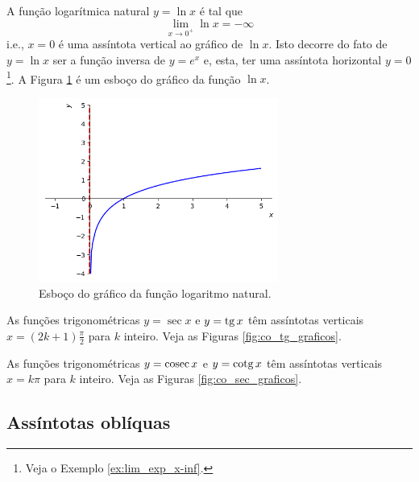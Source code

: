 \begin{ex}
  A função logarítmica natural $y = \ln x$ é tal que
  \begin{equation}
    \lim_{x\to 0^+} \ln x = -\infty
  \end{equation}
  i.e., $x=0$ é uma assíntota vertical ao gráfico de $\ln x$. Isto decorre do fato de $y = \ln x$ ser a função inversa de $y = e^x$ e, esta, ter uma assíntota horizontal $y=0$\footnote{Veja o Exemplo \ref{ex:lim_exp_x-inf}.}. A Figura \ref{fig:ex_lim_assvert_lnx} é um esboço do gráfico da função  $\ln x$.

    \begin{figure}[H]
      \centering
      \includegraphics[width=0.7\textwidth]{./cap_lim/dados/fig_ex_lim_assvert_lnx/fig_ex_lim_assvert_lnx}
      \caption{Esboço do gráfico da função logaritmo natural.}
      \label{fig:ex_lim_assvert_lnx}
    \end{figure}  
\end{ex}

\begin{ex}
  As funções trigonométricas $y = \sec x$ e $\displaystyle y = \operatorname{tg} x$ têm assíntotas verticais $x = (2k+1)\frac{\pi}{2}$ para $k$ inteiro. Veja as Figuras \ref{fig:co_tg_graficos}.
\end{ex}

\begin{ex}
  As funções trigonométricas $y = \operatorname{cosec} x$ e $\displaystyle y = \operatorname{cotg} x$ têm assíntotas verticais $x = k\pi$ para $k$ inteiro. Veja as Figuras \ref{fig:co_sec_graficos}.
\end{ex}

\subsection{Assíntotas oblíquas}

